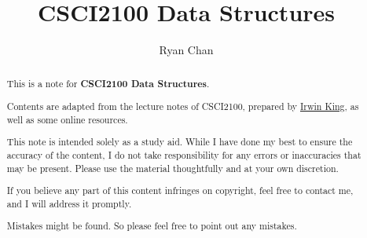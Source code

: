 \documentclass[a4paper]{report}
\author{Ryan Chan}
\title{CSCI2100 Data Structures}
\begin{document}
\setlength\parindent{0pt}

\maketitle

\newpage

\begin{abstract}
	This is a note for \textbf{CSCI2100 Data Structures}. 
	
	Contents are adapted from the lecture notes of CSCI2100, prepared by \href{https://www.cse.cuhk.edu.hk/irwin.king/}{Irwin King}, as well as some online resources.
	
	This note is intended solely as a study aid. While I have done my best to ensure the accuracy of the content, I do not take responsibility for any errors or inaccuracies that may be present. Please use the material thoughtfully and at your own discretion.
	
	If you believe any part of this content infringes on copyright, feel free to contact me, and I will address it promptly.
	
	Mistakes might be found. So please feel free to point out any mistakes.
\end{abstract}

\newpage

\tableofcontents

\setlength{\parskip}{5pt}
\end{document}
